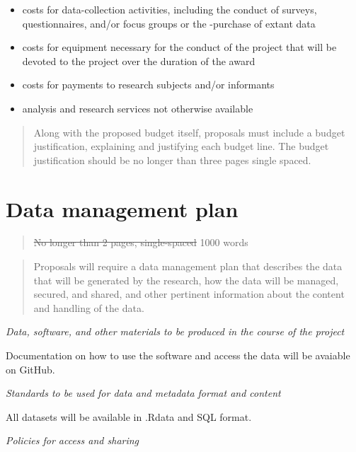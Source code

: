 \documentclass[
      12pt,
        ]{article}
\providecommand{\tightlist}{
  \setlength{\itemsep}{0pt}
  \setlength{\parskip}{0pt}
}
\begin{document}
\begin{itemize}
\tightlist
\item
  costs for data-collection activities, including the conduct of surveys, questionnaires, and/or focus groups or the -purchase of extant data\\
\item
  costs for equipment necessary for the conduct of the project that will be devoted to the project over the duration of the award\\
\item
  costs for payments to research subjects and/or informants
\item
  analysis and research services not otherwise available
\end{itemize}

\begin{quote}
Along with the proposed budget itself, proposals must include a budget justification, explaining and justifying each budget line. The budget justification should be no longer than three pages single spaced.
\end{quote}

\newpage

\hypertarget{data-management-plan}{%
\section{Data management plan}\label{data-management-plan}}

\begin{quote}
\sout{No longer than 2 pages, single-spaced} 1000 words
\end{quote}

\begin{quote}
Proposals will require a data management plan that describes the data that will be generated by the research, how the data will be managed, secured, and shared, and other pertinent information about the content and handling of the data.
\end{quote}

\emph{Data, software, and other materials to be produced in the course of the project}

Documentation on how to use the software and access the data will be avaiable on GitHub.

\emph{Standards to be used for data and metadata format and content}

All datasets will be available in .Rdata and SQL format.

\emph{Policies for access and sharing}
\end{document}
